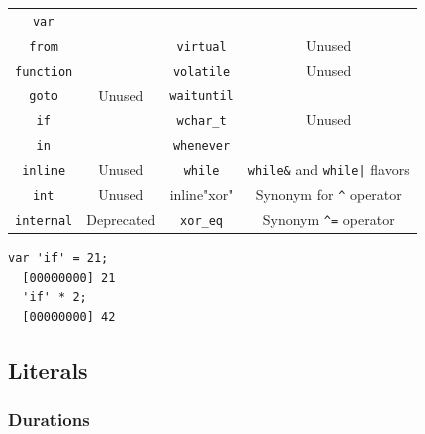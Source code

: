 \documentclass[openright,twoside,12pt]{report}
\begin{document}
\begin{table}[htp]
\begin{tabular}{|c|c||c|c|}
    \lstinline"var"               &                                         \\
    \lstinline"from"              &                                         &
    \lstinline"virtual"           & Unused                                  \\
    \lstinline"function"          &                                         &
    \lstinline"volatile"          & Unused                                  \\
    \lstinline"goto"              & Unused                                  &
    \lstinline"waituntil"         &                                         \\
    \lstinline"if"                &                                         &
    \lstinline"wchar_t"           & Unused                                  \\
    \lstinline"in"                &                                         &
    \lstinline"whenever"          &                                         \\
    \lstinline"inline"            & Unused                                  &
    \lstinline"while"             & \lstinline|while&| and
                                    \lstinline-while|- flavors              \\
    \lstinline"int"               & Unused                                  &
    inline"xor"                   & Synonym for \lstinline|^| operator      \\
    \lstinline"internal"          & Deprecated                              &
    \lstinline"xor_eq"            & Synonym \lstinline|^=| operator         \\
    \hline
  \end{tabular}
\end{table}
\renewcommand{\baselinestretch}{1}

\begin{lstlisting}[caption=Escaping keywords,label=lst:escape-keyword,float=htp]
  var 'if' = 21;
  [00000000] 21
  'if' * 2;
  [00000000] 42
\end{lstlisting}

\subsection{Literals}
\subsubsection{Durations}
\end{document}
